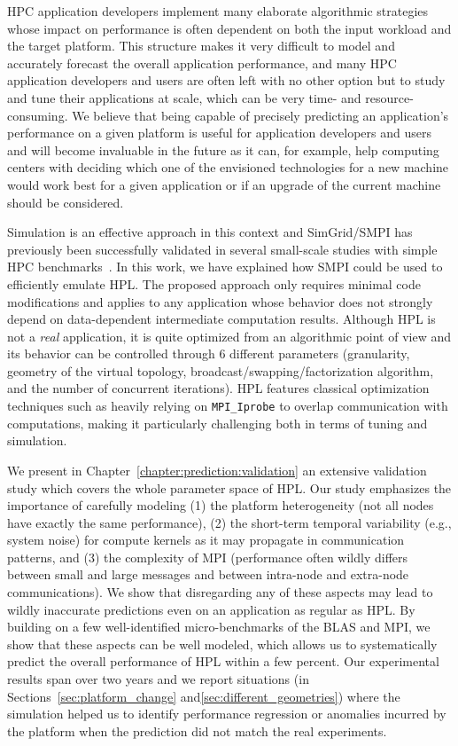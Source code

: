     HPC application developers implement many elaborate algorithmic strategies whose impact on performance is often
    dependent on both the input workload and the target platform. This structure makes it very difficult to model and
    accurately forecast the overall application performance, and many HPC application developers and users are often
    left with no other option but to study and tune their applications at scale, which can be very time- and
    resource-consuming. We believe that being capable of precisely predicting an application's performance on a given
    platform is useful for application developers and users and will become invaluable in the future as it can, for
    example, help computing centers with deciding which one of the envisioned technologies for a new machine would work
    best for a given application or if an upgrade of the current machine should be considered.

    Simulation is an effective approach in this context and SimGrid/SMPI has previously been successfully validated in
    several small-scale studies with simple HPC benchmarks~\cite{smpi,heinrich:hal-01523608}. In this work, we have
    explained how SMPI could be used to efficiently emulate HPL. The proposed approach only requires minimal code
    modifications and applies to any application whose behavior does not strongly depend on data-dependent intermediate
    computation results.  Although HPL is not a \emph{real} application, it is quite optimized from an algorithmic point
    of view and its behavior can be controlled through 6 different parameters (granularity, geometry of the virtual
    topology, broadcast/swapping/factorization algorithm, and the number of concurrent iterations). HPL features
    classical optimization techniques such as heavily relying on \texttt{MPI\_Iprobe} to overlap communication with
    computations, making it particularly challenging both in terms of tuning and simulation.

    We present in Chapter~\ref{chapter:prediction:validation} an extensive validation study which covers the whole
    parameter space of HPL. Our study emphasizes the importance of carefully modeling (1) the platform heterogeneity
    (not all nodes have exactly the same performance), (2) the short-term temporal variability (e.g., system noise) for
    compute kernels as it may propagate in communication patterns, and (3) the complexity of MPI (performance often
    wildly differs between small and large messages and between intra-node and extra-node communications). We show that
    disregarding any of these aspects may lead to wildly inaccurate predictions even on an application as regular as
    HPL. By building on a few well-identified micro-benchmarks of the BLAS and MPI, we show that these aspects can be
    well modeled, which allows us to systematically predict the overall performance of HPL within a few percent. Our
    experimental results span over two years and we report situations (in Sections~\ref{sec:platform_change}
    and\ref{sec:different_geometries}) where the simulation helped us to identify performance regression or anomalies
    incurred by the platform when the prediction did not match the real experiments.

